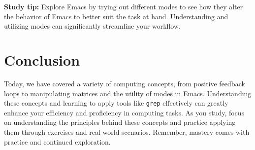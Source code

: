 \documentclass{article}
\begin{document}
\textbf{Study tip:} Explore Emacs by trying out different modes to see how they alter the behavior of Emacs to better suit the task at hand. Understanding and utilizing modes can significantly streamline your workflow.

\section{Conclusion}

Today, we have covered a variety of computing concepts, from positive feedback loops to manipulating matrices and the utility of modes in Emacs. Understanding these concepts and learning to apply tools like \texttt{grep} effectively can greatly enhance your efficiency and proficiency in computing tasks. As you study, focus on understanding the principles behind these concepts and practice applying them through exercises and real-world scenarios. Remember, mastery comes with practice and continued exploration.
\end{document}
